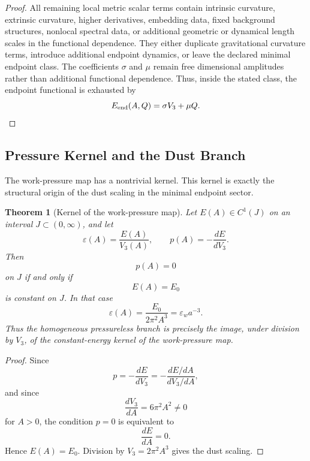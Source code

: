 \documentclass[11pt,a4paper]{article}
\def\dd{d}%
\numberwithin{equation}{section}
\newtheorem{theorem}[criterion]{Theorem}
\theoremstyle{remark}
\newcommand{\dd}{\mathrm{d}}
\begin{document}
\begin{proof}
All remaining local metric scalar terms contain intrinsic curvature, extrinsic curvature, higher derivatives, embedding data, fixed background structures, nonlocal spectral data, or additional geometric or dynamical length scales in the functional dependence. They either duplicate gravitational curvature terms, introduce additional endpoint dynamics, or leave the declared minimal endpoint class. The coefficients \(\sigma\) and \(\mu\) remain free dimensional amplitudes rather than additional functional dependence. Thus, inside the stated class, the endpoint functional is exhausted by
\begin{equation}
E_{\rm end}(A,Q)=\sigma V_3+\mu Q .
\end{equation}
\end{proof}

\subsection{Pressure Kernel and the Dust Branch}
The work-pressure map has a nontrivial kernel. This kernel is exactly the structural origin of the dust scaling in the minimal endpoint sector.

\begin{theorem}[Kernel of the work-pressure map]
Let \(E(A)\in C^1(J)\) on an interval \(J\subset(0,\infty)\), and let
\begin{equation}
\varepsilon(A)=\frac{E(A)}{V_3(A)},
\qquad
p(A)=-\frac{\dd E}{\dd V_3}.
\end{equation}
Then
\begin{equation}
p(A)=0
\end{equation}
on \(J\) if and only if
\begin{equation}
E(A)=E_0
\end{equation}
is constant on \(J\). In that case
\begin{equation}
\varepsilon(A)=\frac{E_0}{2\pi^2A^3}
=\varepsilon_w a^{-3}.
\end{equation}
Thus the homogeneous pressureless branch is precisely the image, under division by \(V_3\), of the constant-energy kernel of the work-pressure map.
\end{theorem}
\begin{proof}
Since
\begin{equation}
p=-\frac{\dd E}{\dd V_3}
=-\frac{\dd E/\dd A}{\dd V_3/\dd A},
\end{equation}
and since
\begin{equation}
\frac{\dd V_3}{\dd A}=6\pi^2A^2\neq0
\end{equation}
for \(A>0\), the condition \(p=0\) is equivalent to
\begin{equation}
\frac{\dd E}{\dd A}=0.
\end{equation}
Hence \(E(A)=E_0\). Division by \(V_3=2\pi^2A^3\) gives the dust scaling.
\end{proof}
\end{document}
